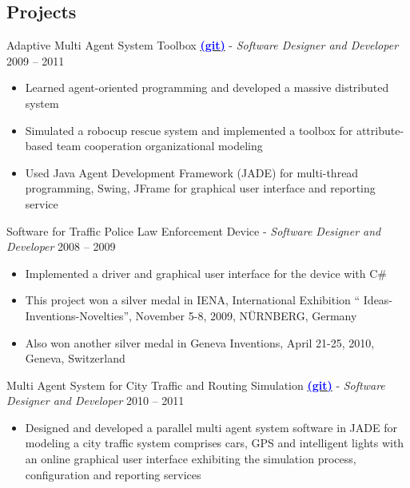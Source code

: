 \documentclass[letter]{res}
\begin{document}
\begin{resume}
\section{Projects}
Adaptive Multi Agent System Toolbox {\href{https://github.com/omid55/team_based_rescue_jade_multi_agent_system}{\textbf{\textcolor{blue}{(git)}}}} \newline
  - {\sl Software Designer and Developer} \hfill 2009 – 2011\\
  \vspace{-4mm}
  \iflong
    \begin{itemize}
    \item Learned agent-oriented programming and developed a massive distributed system
    \item Simulated a robocup rescue system and implemented a toolbox for 				attribute-based team cooperation organizational modeling
    \item Used Java Agent Development Framework (JADE) for multi-thread programming, 		Swing, JFrame for graphical user interface and reporting service
    \end{itemize}
  \fi

Software for Traffic Police Law Enforcement Device \newline
   - {\sl Software Designer and Developer} \hfill 2008 – 2009\\
   \vspace{-4mm}
   \iflong
      \begin{itemize}
        \item Implemented a driver and graphical user interface for the device with C\#
        \item This project won a silver medal in IENA, International Exhibition `` Ideas-Inventions-Novelties'', November 5-8, 2009, N\"{U}RNBERG, Germany
        \item Also won another silver medal in Geneva Inventions, April 21-25, 2010, Geneva, Switzerland
      \end{itemize}
   \fi
   
Multi Agent System for City Traffic and Routing Simulation {\href{https://github.com/omid55/city_routing_model_jade_mutli_agent_system}{\textbf{\textcolor{blue}{(git)}}}} \newline
   - {\sl Software Designer and Developer} \hfill 2010 – 2011\\
   \vspace{-4mm}
   \iflong
     \begin{itemize}
        \item Designed and developed a parallel multi agent system software in JADE for modeling a city traffic system comprises cars, GPS and intelligent lights with an online graphical user interface exhibiting the simulation process, configuration and reporting services
      \end{itemize}
	\fi
    

\end{resume}
\end{document}
